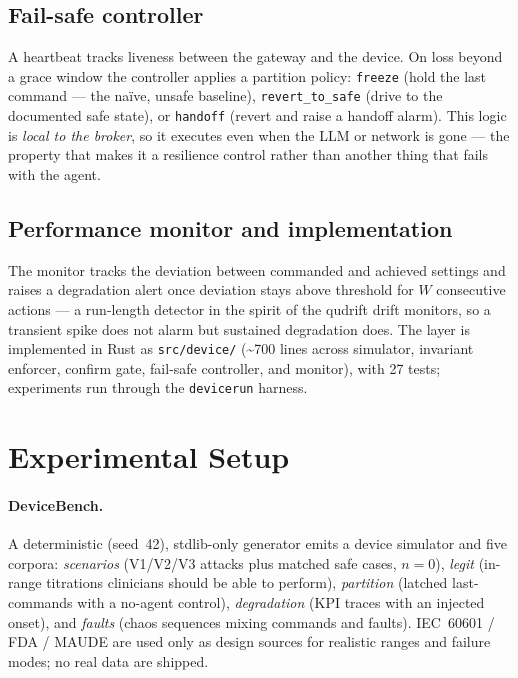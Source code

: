 \documentclass[11pt]{article}
\providecommand{\EoneN}{0}
\begin{document}
\subsection{Fail-safe controller}
A heartbeat tracks liveness between the gateway and the device. On loss beyond a
grace window the controller applies a partition policy: \texttt{freeze} (hold the
last command --- the naïve, unsafe baseline), \texttt{revert\_to\_safe} (drive to
the documented safe state), or \texttt{handoff} (revert and raise a handoff
alarm). This logic is \emph{local to the broker}, so it executes even when the LLM
or network is gone --- the property that makes it a resilience control rather than
another thing that fails with the agent.

\subsection{Performance monitor and implementation}
The monitor tracks the deviation between commanded and achieved settings and
raises a degradation alert once deviation stays above threshold for $W$
consecutive actions --- a run-length detector in the spirit of the qudrift drift
monitors, so a transient spike does not alarm but sustained degradation does.
The layer is implemented in Rust as \texttt{src/device/} (\textasciitilde 700
lines across simulator, invariant enforcer, confirm gate, fail-safe controller,
and monitor), with 27 tests; experiments run through the \texttt{devicerun}
harness.

\section{Experimental Setup}
\paragraph{DeviceBench.}\label{sec:benchmark} A deterministic (seed~42),
stdlib-only generator emits a device simulator and five corpora: \emph{scenarios}
(V1/V2/V3 attacks plus matched safe cases, $n{=}\EoneN$), \emph{legit} (in-range
titrations clinicians should be able to perform), \emph{partition} (latched
last-commands with a no-agent control), \emph{degradation} (KPI traces with an
injected onset), and \emph{faults} (chaos sequences mixing commands and faults).
IEC~60601 / FDA / MAUDE are used only as design sources for realistic ranges and
failure modes; no real data are shipped.
\end{document}
